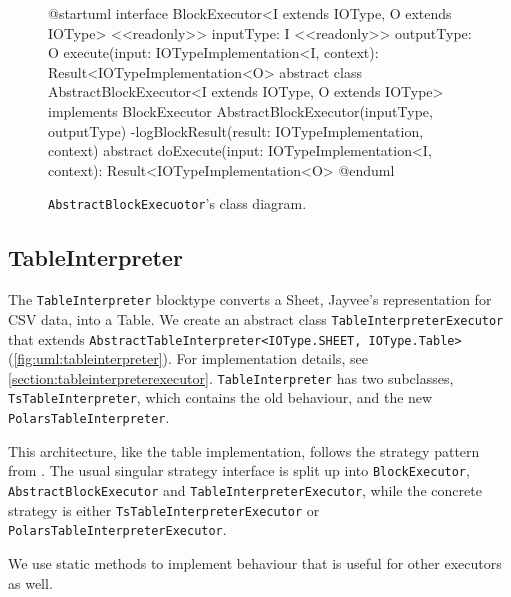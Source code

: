 \begin{figure}
	\begin{plantuml}
		@startuml
		interface BlockExecutor<I extends IOType, O extends IOType> {
				<<readonly>> inputType: I
				<<readonly>> outputType: O
				execute(input: IOTypeImplementation<I\>, context): Result<IOTypeImplementation<O>\>
			}
		abstract class AbstractBlockExecutor<I extends IOType, O extends IOType> implements BlockExecutor {
				AbstractBlockExecutor(inputType, outputType)
				-logBlockResult(result: IOTypeImplementation, context)
				{abstract} doExecute(input: IOTypeImplementation<I\>, context): Result<IOTypeImplementation<O>\>
			}
		@enduml
	\end{plantuml}
	\caption{\Verb|AbstractBlockExecuotor|'s  class diagram.}
	\label{fig:uml:abstractblockexecutor}
\end{figure}

\subsection{TableInterpreter}
The \Verb|TableInterpreter| blocktype converts a Sheet, Jayvee's representation for \ac{CSV} data, into a Table.
We create an abstract class \Verb|TableInterpreterExecutor| that extends \Verb|AbstractTableInterpreter<IOType.SHEET, IOType.Table>| (\ref{fig:uml:tableinterpreter}).
For implementation details, see \ref{section:tableinterpreterexecutor}.
\Verb|TableInterpreter| has two subclasses, \Verb|TsTableInterpreter|, which contains the old behaviour, and the new \Verb|PolarsTableInterpreter|.

This architecture, like the table implementation, follows the strategy pattern from \autocite{Dooley2024}.
The usual singular strategy interface is split up into \Verb|BlockExecutor|, \Verb|AbstractBlockExecutor| and \Verb|TableInterpreterExecutor|, while the concrete strategy is either \Verb|TsTableInterpreterExecutor| or \Verb|PolarsTableInterpreterExecutor|.

We use static methods to implement behaviour that is useful for other executors as well.

